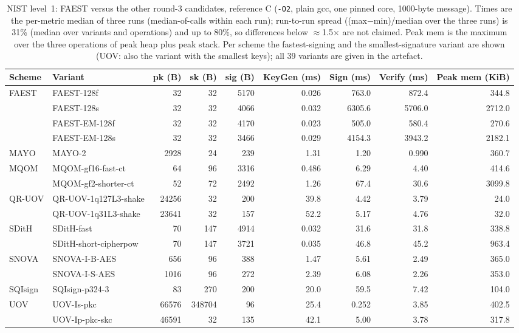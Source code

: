 \begin{table}[t]
\centering
\caption{NIST level~1: FAEST versus the other round-3 candidates, reference C (\texttt{-O2}, plain gcc, one pinned core, 1000-byte message). Times are the per-metric median of three runs (median-of-calls within each run); run-to-run spread ((max$-$min)/median over the three runs) is 31\% (median over variants and operations) and up to 80\%, so differences below $\approx$1.5$\times$ are not claimed. Peak mem is the maximum over the three operations of peak heap plus peak stack. Per scheme the fastest-signing and the smallest-signature variant are shown (UOV: also the variant with the smallest keys); all 39 variants are given in the artefact.}
\label{tab:l1}
\small
\begin{tabular}{llrrrrrrr}
\toprule
Scheme & Variant & pk (B) & sk (B) & sig (B) & KeyGen (ms) & Sign (ms) & Verify (ms) & Peak mem (KiB) \\
\midrule
FAEST & FAEST-128f & 32 & 32 & 5170 & 0.026 & 763.0 & 872.4 & 344.8 \\
 & FAEST-128s & 32 & 32 & 4066 & 0.032 & 6305.6 & 5706.0 & 2712.0 \\
 & FAEST-EM-128f & 32 & 32 & 4170 & 0.023 & 505.0 & 580.4 & 270.6 \\
 & FAEST-EM-128s & 32 & 32 & 3466 & 0.029 & 4154.3 & 3943.2 & 2182.1 \\
\midrule
MAYO & MAYO-2 & 2928 & 24 & 239 & 1.31 & 1.20 & 0.990 & 360.7 \\
\midrule
MQOM & MQOM-gf16-fast-ct & 64 & 96 & 3316 & 0.486 & 6.29 & 4.40 & 414.6 \\
 & MQOM-gf2-shorter-ct & 52 & 72 & 2492 & 1.26 & 67.4 & 30.6 & 3099.8 \\
\midrule
QR-UOV & QR-UOV-1q127L3-shake & 24256 & 32 & 200 & 39.8 & 4.42 & 3.79 & 24.0 \\
 & QR-UOV-1q31L3-shake & 23641 & 32 & 157 & 52.2 & 5.17 & 4.76 & 32.0 \\
\midrule
SDitH & SDitH-fast & 70 & 147 & 4914 & 0.032 & 31.6 & 31.8 & 338.8 \\
 & SDitH-short-cipherpow & 70 & 147 & 3721 & 0.035 & 46.8 & 45.2 & 963.4 \\
\midrule
SNOVA & SNOVA-I-B-AES & 656 & 96 & 388 & 1.47 & 5.61 & 2.49 & 365.0 \\
 & SNOVA-I-S-AES & 1016 & 96 & 272 & 2.39 & 6.08 & 2.26 & 353.0 \\
\midrule
SQIsign & SQIsign-p324-3 & 83 & 270 & 200 & 20.0 & 59.5 & 7.42 & 104.0 \\
\midrule
UOV & UOV-Is-pkc & 66576 & 348704 & 96 & 25.4 & 0.252 & 3.85 & 402.5 \\
 & UOV-Ip-pkc-skc & 46591 & 32 & 135 & 42.1 & 5.00 & 3.78 & 317.8 \\
\bottomrule
\end{tabular}
\end{table}
